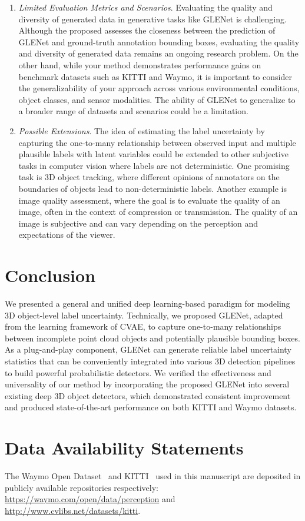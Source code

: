 \documentclass[twocolumn]{svjour3}
\begin{document}
{\begin{enumerate}[label=(\arabic*)]
	\item \textit{Limited Evaluation Metrics and Scenarios}. 
	Evaluating the quality and diversity of generated data in generative tasks like GLENet is challenging. 
Although the proposed  assesses the closeness between the prediction of GLENet and ground-truth annotation bounding boxes, evaluating the quality and diversity of generated data remains an ongoing research problem.
	On the other hand, while your method demonstrates performance gains on benchmark datasets such as KITTI and Waymo, it is important to consider the generalizability of your approach across various environmental conditions, object classes, and sensor modalities. The ability of GLENet to generalize to a broader range of datasets and scenarios could be a limitation.
	\item \textit{Possible Extensions}. The idea of estimating the label uncertainty by capturing the one-to-many relationship between observed input and multiple plausible labels with latent variables could be extended to other subjective tasks in computer vision where labels are not deterministic. One promising task is 3D object tracking, where different opinions of annotators on the boundaries of objects lead to non-deterministic labels. Another example is image quality assessment, where the goal is to evaluate the quality of an image, often in the context of compression or transmission. The quality of an image is subjective and can vary depending on the perception and expectations of the viewer.
\end{enumerate}
}


\section{Conclusion} 
\label{sec:con}
We presented a general and unified deep learning-based paradigm for modeling 3D object-level label uncertainty. Technically, we proposed GLENet, adapted from the learning framework of CVAE, to capture one-to-many relationships between incomplete point cloud objects and potentially plausible bounding boxes. As a plug-and-play component, GLENet can generate reliable label uncertainty statistics that can be conveniently integrated into various 3D detection pipelines to build powerful probabilistic detectors. We verified the effectiveness and universality of our method by incorporating the proposed GLENet into several existing deep 3D object detectors, which demonstrated consistent improvement and produced state-of-the-art performance on both KITTI and Waymo datasets.

\section*{Data Availability Statements}
The Waymo Open Dataset~\citep{Sun_2020_CVPR} and KITTI~\citep{Geiger_KITTI} used in this manuscript are deposited in publicly available repositories respectively: \url{https://waymo.com/open/data/perception} and \url{http://www.cvlibs.net/datasets/kitti}.


   
\end{document}
